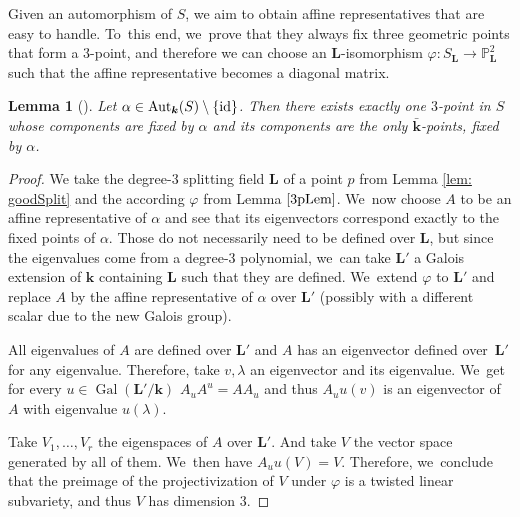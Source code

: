 \documentclass[JEP,XML,SOM,Unicode,NoFloatCountersInSection, NoEqCountersInSection,published]{cedram}
\newcommand{\id}{\textup{id}}
\DeclareMathOperator{\Gal}{Gal}
\newtheorem{lemma}[theorem]{Lemma}
\theoremstyle{definition}
\newcommand{\kk}{{\boldsymbol{k}}}
\newcommand{\LL}{{\boldsymbol{L}}}
\DeclareMathOperator{\Aut}{Aut}
\begin{document}
Given an automorphism of $S$, we aim to obtain affine representatives that are easy to handle. To~this end, we~prove that they always fix three geometric points that form a $3$\nobreakdash-point, and therefore we can choose an $\LL$-isomorphism $\varphi \colon S_{\LL} \to \mathbb{P}^2_{\LL}$ such that the affine representative becomes a diagonal matrix.

\begin{lemma}[\cite{BSYUnp}] \label{Fixpoints}
Let $\alpha \in \Aut_{\kk}(S) \setminus \{ \id \}$. Then there exists exactly one $3$\nobreakdash-point in $S$ whose components are fixed by $\alpha$ and its components are the only $\bar{\kk}$-points, fixed by $\alpha$.
\end{lemma}

\begin{proof}
We take the degree-$3$ splitting field $\LL$ of a point $p$ from Lemma \ref{lem: goodSplit} and the according $\varphi$ from Lemma $\ref{3pLem}$. We~now choose $A$ to be an affine representative of $\alpha$ and see that its eigenvectors correspond exactly to the fixed points of $\alpha$. Those do not necessarily need to be defined over $\LL$, but since the eigenvalues come from a degree-$3$ polynomial, we~can take $\LL'$ a Galois extension of $\kk$ containing $\LL$ such that they are defined. We~extend $\varphi$ to $\LL'$ and replace $A$ by the affine representative of $\alpha$ over $\LL'$ (possibly with a different scalar due to the new Galois group).

All eigenvalues of $A$ are defined over $\LL'$ and $A$ has an eigenvector defined over~$\LL'$ for any eigenvalue. Therefore, take $v, \lambda$ an eigenvector and its eigenvalue. We~get for every $u \in \Gal(\LL'/ \kk)$ $A_u A^u = A A_u$ and thus $A_u u(v)$ is an eigenvector of $A$ with eigenvalue $u(\lambda)$.

Take $V_1, \dots , V_r$ the eigenspaces of $A$ over $\LL'$. And take $V$ the vector space generated by all of them. We~then have $A_u u(V) = V$. Therefore, we~conclude that the preimage of the projectivization of $V$ under $\varphi$ is a twisted linear subvariety, and thus $V$ has dimension $3$.


\end{proof}
\end{document}
